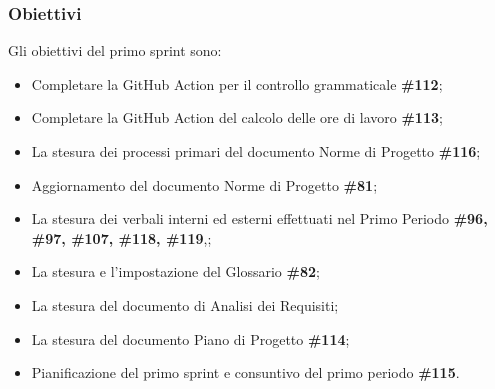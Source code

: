 \subsubsection{Obiettivi}

Gli obiettivi del primo sprint sono:
\begin{itemize}
    \item Completare la GitHub Action per il controllo grammaticale \textbf{\#112};
    \item Completare la GitHub Action del calcolo delle ore di lavoro \textbf{\#113};
    \item La stesura dei processi primari del documento Norme di Progetto \textbf{\#116};
    \item Aggiornamento del documento Norme di Progetto \textbf{\#81};
    \item La stesura dei verbali interni ed esterni effettuati nel Primo Periodo \textbf{\#96, \#97, \#107, \#118, \#119},;
    \item La stesura e l'impostazione del Glossario \textbf{\#82};
    \item La stesura del documento di Analisi dei Requisiti;
    \item La stesura del documento Piano di Progetto \textbf{\#114};
    \item Pianificazione del primo sprint e consuntivo del primo periodo \textbf{\#115}.
\end{itemize}
